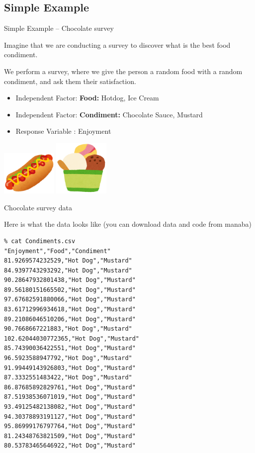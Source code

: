 \subsection{Simple Example}
\begin{frame}{Simple Example -- Chocolate survey}

  Imagine that we are conducting a survey to discover what is the best
  food condiment.\bigskip

  We perform a survey, where we give the person a random food with a random condiment,
  and ask them their satisfaction.
  \begin{itemize}
  \item Independent Factor: {\bf Food:} Hotdog, Ice Cream
  \item Independent Factor: {\bf Condiment:} Chocolate Sauce, Mustard
  \item Response Variable : Enjoyment
  \end{itemize}

  \includegraphics[width=0.2\textwidth]{../img/irasutoya_hotdog.png}
  \hfill
  \includegraphics[width=0.2\textwidth]{../img/irasutoya_icecream.png}
\end{frame}

\begin{frame}[fragile]{Chocolate survey data}

  Here is what the data looks like (you can download data and code from manaba)\medskip

\begin{verbatim}
% cat Condiments.csv
"Enjoyment","Food","Condiment"
81.9269574232529,"Hot Dog","Mustard"
84.9397743293292,"Hot Dog","Mustard"
90.28647932801438,"Hot Dog","Mustard"
89.56180151665502,"Hot Dog","Mustard"
97.67682591880066,"Hot Dog","Mustard"
83.61712996934618,"Hot Dog","Mustard"
89.21086046510206,"Hot Dog","Mustard"
90.7668667221883,"Hot Dog","Mustard"
102.62044030772365,"Hot Dog","Mustard"
85.74390036422551,"Hot Dog","Mustard"
96.5923588947792,"Hot Dog","Mustard"
91.99449143926803,"Hot Dog","Mustard"
87.3332551483422,"Hot Dog","Mustard"
86.87685892829761,"Hot Dog","Mustard"
87.51938536071019,"Hot Dog","Mustard"
93.49125482138082,"Hot Dog","Mustard"
94.30378893191127,"Hot Dog","Mustard"
95.86999176797764,"Hot Dog","Mustard"
81.24348763821509,"Hot Dog","Mustard"
80.53783465646922,"Hot Dog","Mustard"
\end{verbatim}
\end{frame}

